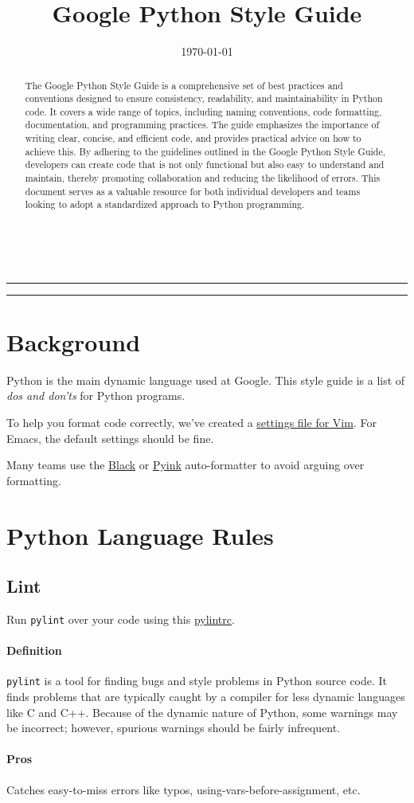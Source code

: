 \documentclass[
]{article}
\title{Google Python Style Guide}
\date{\today}
\makeatletter
\renewcommand{\maketitle}{
    \begin{titlepage}
        \begin{center}
            \vspace*{\fill}
            {\Huge \textbf{\@title}}
            \par\vspace{1.5cm}
            {\large \@date} \\[4cm]
            \hrule
            \begin{abstract}
              \large
              The Google Python Style Guide is a comprehensive set of best practices and conventions designed to ensure consistency, readability, and maintainability in Python code.
              It covers a wide range of topics, including naming conventions, code formatting, documentation, and programming practices.
              The guide emphasizes the importance of writing clear, concise, and efficient code, and provides practical advice on how to achieve this. By adhering to the guidelines outlined in the Google Python Style Guide, developers can create code that is not only functional but also easy to understand and maintain, thereby promoting collaboration and reducing the likelihood of errors.
              This document serves as a valuable resource for both individual developers and teams looking to adopt a standardized approach to Python programming.
            \end{abstract}
            \hrule
            \vspace*{\fill}
          \end{center}
        \end{titlepage}
        }
\makeatother
\begin{document}
\maketitle

\clearpage
{
\setcounter{tocdepth}{3}
\tableofcontents
}

\clearpage
\section{Background}

Python is the main dynamic language used at Google. This style guide is
a list of \emph{dos and don'ts} for Python programs.

To help you format code correctly, we've created a
\href{google_python_style.vim}{settings file for Vim}. For Emacs, the
default settings should be fine.

Many teams use the \href{https://github.com/psf/black}{Black} or
\href{https://github.com/google/pyink}{Pyink} auto-formatter to avoid
arguing over formatting.

\section{Python Language Rules}

\subsection{Lint}

Run \texttt{pylint} over your code using this
\href{https://google.github.io/styleguide/pylintrc}{pylintrc}.

\paragraph{Definition}

\texttt{pylint} is a tool for finding bugs and style problems in Python
source code. It finds problems that are typically caught by a compiler
for less dynamic languages like C and C++. Because of the dynamic nature
of Python, some warnings may be incorrect; however, spurious warnings
should be fairly infrequent.

\paragraph{Pros}

Catches easy-to-miss errors like typos, using-vars-before-assignment,
etc.
\end{document}

